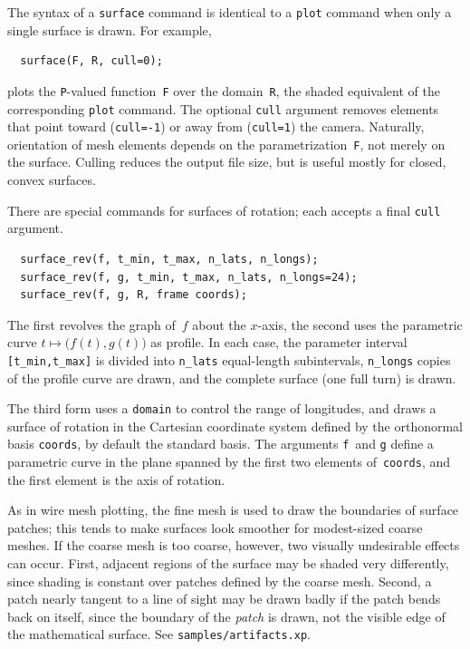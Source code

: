 \documentclass[12pt,letterpaper]{book}
\newcommand{\code}[1]{\texttt{#1}}
\newcommand{\filename}[1]{\texttt{#1}}
\newcommand{\teximath}[1]{$#1$}
\newcommand{\findex}[1]{\ignorespaces}
\begin{document}
The syntax of a \code{surface} command is identical to a \code{plot}
command when only a single surface is drawn. For example,
\findex{surface}
\begin{verbatim}
  surface(F, R, cull=0);
\end{verbatim}
plots the \code{P}-valued function~\code{F} over the domain~\code{R},
the shaded equivalent of the corresponding \code{plot} command. The
optional \code{cull} argument removes elements that point toward
(\code{cull=-1}) or away from (\code{cull=1}) the camera. Naturally,
orientation of mesh elements depends on the parametrization~\code{F},
not merely on the surface. Culling reduces the output file size, but
is useful mostly for closed, convex surfaces.

There are special commands for surfaces of rotation; each accepts a
final \code{cull} argument.
\findex{surface\_rev}
\begin{verbatim}
  surface_rev(f, t_min, t_max, n_lats, n_longs);
  surface_rev(f, g, t_min, t_max, n_lats, n_longs=24);
  surface_rev(f, g, R, frame coords);
\end{verbatim}
The first revolves the graph of~\teximath{f} about the
\teximath{x}-axis, the second uses the parametric curve
\teximath{t\mapsto\bigl(f(t),g(t)\bigr)} as profile. In each case, the
parameter interval \verb+[t_min,t_max]+ is divided into \verb+n_lats+
equal-length subintervals, \verb+n_longs+ copies of the profile curve
are drawn, and the complete surface (one full turn) is drawn.

The third form uses a \code{domain} to control the range of
longitudes, and draws a surface of rotation in the Cartesian
coordinate system defined by the orthonormal basis \code{coords}, by
default the standard basis. The arguments \code{f}~and \code{g} define
a parametric curve in the plane spanned by the first two elements
of~\code{coords}, and the first element is the axis of rotation.

As in wire mesh plotting, the fine mesh is used to draw the boundaries
of surface patches; this tends to make surfaces look smoother for
modest-sized coarse meshes. If the coarse mesh is too coarse, however,
two visually undesirable effects can occur. First, adjacent regions of
the surface may be shaded very differently, since shading is constant
over patches defined by the coarse mesh. Second, a patch nearly
tangent to a line of sight may be drawn badly if the patch bends back
on itself, since the boundary of the \emph{patch} is drawn, not the
visible edge of the mathematical surface. See
\filename{samples/artifacts.xp}.
\end{document}
